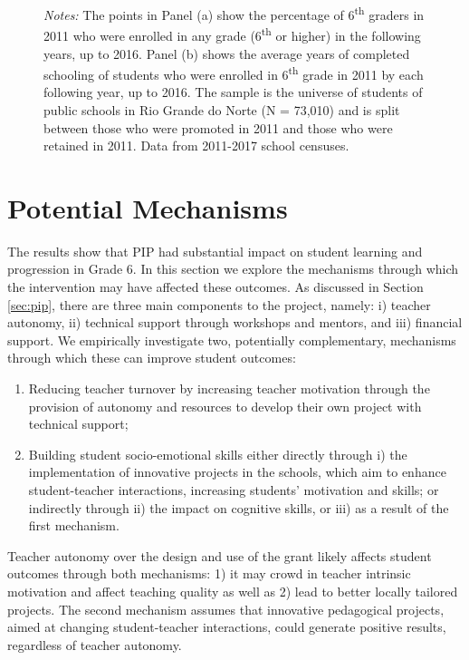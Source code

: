 \documentclass[11pt,a4paper]{article}
\begin{document}
\begin{figure}[ht!]
    \begin{minipage}{0.825\textwidth}
        \small{\textit{Notes:} The points in Panel (a) show the percentage of 6\textsuperscript{th} graders in 2011 who were enrolled in any grade (6\textsuperscript{th} or higher) in the following years, up to 2016. Panel (b) shows the average years of completed schooling of students who were enrolled in 6\textsuperscript{th} grade in 2011 by each following year, up to 2016. The sample is the universe of students of public schools in Rio Grande do Norte (N = 73,010) and is split between those who were promoted in 2011 and those who were retained in 2011. Data from 2011-2017 school censuses.}
    \end{minipage}
\end{figure}


\section{Potential Mechanisms} \label{sec:mechanism}

The results show that PIP had substantial impact on student learning and progression in Grade 6. In this section we explore the mechanisms through which the intervention may have affected these outcomes. As discussed in Section \ref{sec:pip}, there are three main components to the project, namely: i) teacher autonomy, ii) technical support through workshops and mentors, and iii) financial support. We empirically investigate two, potentially complementary, mechanisms through which these can improve student outcomes: 

\begin{enumerate}[nosep]
    \item Reducing teacher turnover by increasing teacher motivation through the provision of autonomy and resources to develop their own project with technical support;
    \item Building student socio-emotional skills either directly through i) the implementation of innovative projects in the schools, which aim to enhance student-teacher interactions, increasing students' motivation and skills; or indirectly through ii) the impact on cognitive skills, or iii) as a result of the first mechanism. 
\end{enumerate}

Teacher autonomy over the design and use of the grant likely affects student outcomes through both mechanisms: 1) it may crowd in teacher intrinsic motivation and affect teaching quality as well as 2) lead to better locally tailored projects. The second mechanism assumes that innovative pedagogical projects, aimed at changing student-teacher interactions, could generate positive results, regardless of teacher autonomy.  
\end{document}
